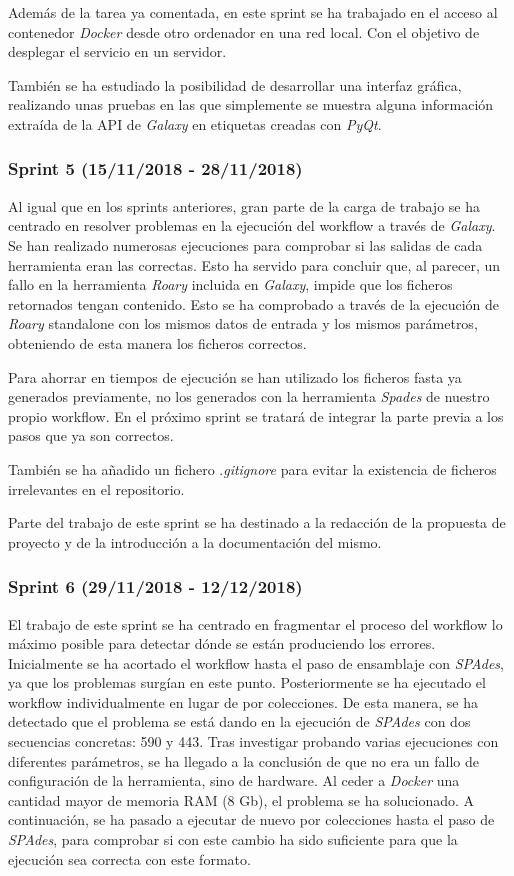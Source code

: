 Además de la tarea ya comentada, en este sprint se ha trabajado en el acceso al contenedor \textit{Docker} desde otro ordenador en una red local. Con el objetivo de desplegar el servicio en un servidor.

También se ha estudiado la posibilidad de desarrollar una interfaz gráfica, realizando unas pruebas en las que simplemente se muestra alguna información extraída de la API de \textit{Galaxy} en etiquetas creadas con \textit{PyQt}.

\subsubsection{Sprint 5 (15/11/2018 - 28/11/2018)}
Al igual que en los sprints anteriores, gran parte de la carga de trabajo se ha centrado en resolver problemas en la ejecución del workflow a través de \textit{Galaxy}. Se han realizado numerosas ejecuciones para comprobar si las salidas de cada herramienta eran las correctas. Esto ha servido para concluir que, al parecer, un fallo en la herramienta \textit{Roary} incluida en \textit{Galaxy}, impide que los ficheros retornados tengan contenido. Esto se ha comprobado a través de la ejecución de \textit{Roary} standalone con los mismos datos de entrada y los mismos parámetros, obteniendo de esta manera los ficheros correctos.

Para ahorrar en tiempos de ejecución se han utilizado los ficheros fasta ya generados previamente, no los generados con la herramienta \textit{Spades} de nuestro propio workflow. En el próximo sprint se tratará de integrar la parte previa a los pasos que ya son correctos.

También se ha añadido un fichero .\textit{gitignore} para evitar la existencia de ficheros irrelevantes en el repositorio.

Parte del trabajo de este sprint se ha destinado a la redacción de la propuesta de proyecto y de la introducción a la documentación del mismo.

\subsubsection{Sprint 6 (29/11/2018 - 12/12/2018)}
El trabajo de este sprint se ha centrado en fragmentar el proceso del workflow lo máximo posible para detectar dónde se están produciendo los errores.
Inicialmente se ha acortado el workflow hasta el paso de ensamblaje con \textit{SPAdes}, ya que los problemas surgían en este punto. Posteriormente se ha ejecutado el workflow individualmente en lugar de por colecciones. De esta manera, se ha detectado que el problema se está dando en la ejecución de \textit{SPAdes} con dos secuencias concretas: 590 y 443. Tras investigar probando varias ejecuciones con diferentes parámetros, se ha llegado a la conclusión de que no era un fallo de configuración de la herramienta, sino de hardware. Al ceder a \textit{Docker} una cantidad mayor de memoria RAM (8 Gb), el problema se ha solucionado. 
A continuación, se ha pasado a ejecutar de nuevo por colecciones hasta el paso de \textit{SPAdes}, para comprobar si con este cambio ha sido suficiente para que la ejecución sea correcta con este formato. 

